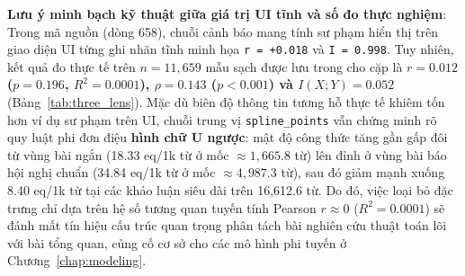 \textbf{Lưu ý minh bạch kỹ thuật giữa giá trị UI tĩnh và số đo thực nghiệm}: Trong mã nguồn  (dòng 658), chuỗi cảnh báo mang tính sư phạm hiển thị trên giao diện UI từng ghi nhãn tĩnh minh họa \texttt{r = +0.018} và \texttt{I = 0.998}. Tuy nhiên, kết quả đo thực tế trên $n = 11,659$ mẫu sạch được lưu trong  cho cặp  là \textbf{$r = 0.012$ ($p = 0.196$, $R^2 = 0.0001$), $\rho = 0.143$ ($p < 0.001$) và $I(X; Y) = 0.052$} (Bảng~\ref{tab:three_lens}). Mặc dù biên độ thông tin tương hỗ thực tế khiêm tốn hơn ví dụ sư phạm trên UI, chuỗi trung vị \texttt{spline\_points} vẫn chứng minh rõ quy luật phi đơn điệu \textbf{hình chữ U ngược}: mật độ công thức tăng gần gấp đôi từ vùng bài ngắn (18.33 eq/1k từ ở mốc $\approx 1,665.8$ từ) lên đỉnh ở vùng bài báo hội nghị chuẩn (34.84 eq/1k từ ở mốc $\approx 4,987.3$ từ), sau đó giảm mạnh xuống 8.40 eq/1k từ tại các khảo luận siêu dài trên 16,612.6 từ. Do đó, việc loại bỏ đặc trưng chỉ dựa trên hệ số tương quan tuyến tính Pearson $r \approx 0$ ($R^2 = 0.0001$) sẽ đánh mất tín hiệu cấu trúc quan trọng phân tách bài nghiên cứu thuật toán lõi với bài tổng quan, củng cố cơ sở cho các mô hình phi tuyến ở Chương~\ref{chap:modeling}.
